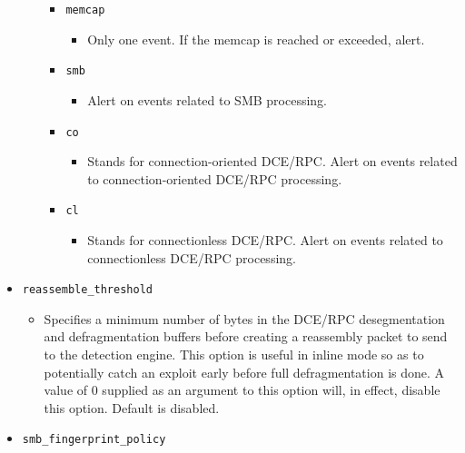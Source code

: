 \documentclass[english]{report}
\begin{document}
\begin{itemize}
\begin{itemize}
\begin{itemize}
\item[] \texttt{memcap}

\begin{itemize}
\item[] Only one event. If the memcap is reached or exceeded, alert.

\end{itemize}

\item[] \texttt{smb}

\begin{itemize}
\item[] Alert on events related to SMB processing.
\end{itemize}

\item[] \texttt{co}

\begin{itemize}

\item[] Stands for connection-oriented DCE/RPC. Alert on events related to
connection-oriented DCE/RPC processing.

\end{itemize}

\item[] \texttt{cl}
\begin{itemize}

\item[] Stands for connectionless DCE/RPC. Alert on events related to
connectionless DCE/RPC processing.

\end{itemize}
\end{itemize}
\end{itemize}

\item[] \texttt{reassemble\_threshold}
\begin{itemize}

\item[] Specifies a minimum number of bytes in the DCE/RPC desegmentation and
defragmentation buffers before creating a reassembly packet to send to the
detection engine. This option is useful in inline mode so as to potentially
catch an exploit early before full defragmentation is done.  A value of 0
supplied as an argument to this option will, in effect, disable this option.
Default is disabled.

\end{itemize}

\item[] \texttt{smb\_fingerprint\_policy}
\begin{itemize}


\end{itemize}
\end{itemize}
\end{document}
